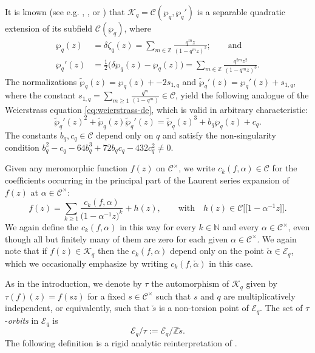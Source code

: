 \documentclass[preprint,12pt]{elsarticle}
\numberwithin{equation}{section} %
\theoremstyle{theorem}
\theoremstyle{definition}
\newcommand{\Cq}{\mathcal{C}} %
\newcommand{\bk}{\mathcal{K}} %
\newcommand{\bkq}{\bk_{q}} %
\newcommand{\ec}{\mathcal{E}} %
\newcommand{\ecq}{\ec_{q}}
\newcommand{\orbitq}{{\ecq/\tau}} %
\newcommand{\Z}{\mathbb{Z}} %
\begin{document}
It is known (see e.g. \cite[\S3]{Roquette}, \cite[\S15.1]{LangElliptic}, or \cite[Thm.~5.1.10]{RigidAnalyticGeometry}) that $\bkq=\Cq(\wp_q,\wp_q')$ is a separable quadratic extension of its subfield $\Cq(\wp_q)$, where
\begin{equation}\label{eq:q-wp-def}\begin{aligned}
    \wp_q(z)&=\delta\zeta_q(z)=\sum_{m\in\Z}\frac{q^mz}{(1-q^mz)^2};\qquad\text{and} \\
    \wp_q'(z)&=\frac{1}{2}\bigl(\delta\wp_q(z)-\wp_q(z)\bigr)=\sum_{m\in\Z}\frac{q^{2m}z^2}{(1-q^mz)^3}.
\end{aligned}
\end{equation} The normalizations $\tilde{\wp}_q(z)=\wp_q(z)+-2s_{1,q}$ and $\tilde{\wp}_q'(z)=\wp_q'(z)+s_{1,q}$, where the constant $s_{1,q}=\sum_{m\geq 1}\frac{q^m}{(1-q^m)}\in\Cq$, yield the following analogue of the Weierstrass equation \eqref{eq:weierstrass-de}, which is valid in arbitrary characteristic:
\begin{equation} \label{eq:q-weierstrass-de}
\tilde{\wp}_q'(z)^2+\tilde{\wp}_q(z)\tilde{\wp}_q'(z)=\tilde{\wp}_q(z)^3+b_q\wp_q(z)+c_q.
\end{equation} The constants $b_q,c_q\in\Cq$ depend only on $q$ and satisfy the non-singularity condition $b_q^2-c_q-64b_q^3+72b_qc_q-432c_q^2\neq 0$.

Given any meromorphic function $f(z)$ on $\Cq^\times$, we write $c_k(f,\alpha)\in\Cq$ for the coefficients occurring in the principal part of the Laurent series expansion of $f(z)$ at $\alpha\in\Cq^\times$:
\begin{equation}\label{eq:laurent-coeffs-q}f(z)=\sum_{k\geq 1}\frac{c_k(f,\alpha)}{\bigl(1-\alpha^{-1}z\bigr)^k}+h(z),\qquad\text{with} \quad h(z)\in \Cq\bigl[\bigl[1-\alpha^{-1}z\bigr]\bigr].\end{equation}
We again define the $c_k(f,\alpha)$ in this way for every $k\in\mathbb{N}$ and every $\alpha\in\Cq^\times$, even though all but finitely many of them are zero for each given $\alpha\in\Cq^\times$. We again note that if $f(z)\in\bkq$ then the $c_k(f,\alpha)$ depend only on the point $\check{\alpha}\in\ecq$, which we occasionally emphasize by writing $c_k(f,\check{\alpha})$ in this case.

As in the introduction, we denote by $\tau$ the automorphism of $\bkq$ given by $\tau(f)(z)=f(sz)$ for a fixed $s\in\Cq^\times$ such that $s$ and $q$ are multiplicatively independent, or equivalently, such that $\check{s}$ is a non-torsion point of $\ecq$. The set of $\tau$-\emph{orbits} in $\ecq$ is \[\orbitq:=\ecq/\Z\check{s}.\]
The following definition is a rigid analytic reinterpretation of \cite[Def.~B.7]{Dreyfus2018}.
\end{document}
